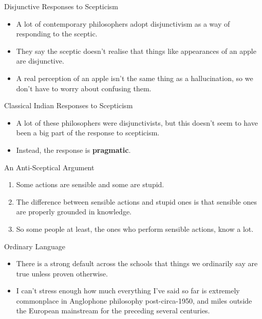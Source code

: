 \documentclass[
  17pt,
  letterpaper,
  ignorenonframetext,
  aspectratio=169,
  handout]{beamer}
\providecommand{\tightlist}{%
  \setlength{\itemsep}{0pt}\setlength{\parskip}{0pt}}\usepackage{longtable,booktabs,array}
\begin{document}
\begin{frame}{Disjunctive Responses to Scepticism}
\protect\hypertarget{disjunctive-responses-to-scepticism}{}
\begin{itemize}[<+->]
\tightlist
\item
  A lot of contemporary philosophers adopt disjunctivism as a way of
  responding to the sceptic.
\item
  They say the sceptic doesn't realise that things like appearances of
  an apple are disjunctive.
\item
  A real perception of an apple isn't the same thing as a hallucination,
  so we don't have to worry about confusing them.
\end{itemize}
\end{frame}

\begin{frame}{Classical Indian Responses to Scepticism}
\protect\hypertarget{classical-indian-responses-to-scepticism}{}
\begin{itemize}[<+->]
\tightlist
\item
  A lot of these philosophers were disjunctivists, but this doesn't seem
  to have been a big part of the response to scepticism.
\item
  Instead, the response is \textbf{pragmatic}.
\end{itemize}
\end{frame}

\begin{frame}{An Anti-Sceptical Argument}
\protect\hypertarget{an-anti-sceptical-argument}{}
\begin{enumerate}[<+->]
\tightlist
\item
  Some actions are sensible and some are stupid.
\item
  The difference between sensible actions and stupid ones is that
  sensible ones are properly grounded in knowledge.
\item
  So some people at least, the ones who perform sensible actions, know a
  lot.
\end{enumerate}
\end{frame}

\begin{frame}{Ordinary Language}
\protect\hypertarget{ordinary-language}{}
\begin{itemize}[<+->]
\tightlist
\item
  There is a strong default across the schools that things we ordinarily
  say are true unless proven otherwise.
\item
  I can't stress enough how much everything I've said so far is
  extremely commonplace in Anglophone philosophy post-circa-1950, and
  miles outside the European mainstream for the preceding several
  centuries.
\end{itemize}
\end{frame}
\end{document}
